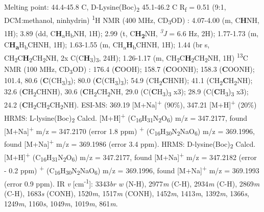 Melting point: 44.4-45.8 \textdegree C,
D-Lysine(Boc)\textsubscript{2} 45.1-46.2 \textdegree C
\newline
R\textsubscript{f} = 0.51 (9:1, DCM:methanol, ninhydrin)
\newline
\textsuperscript{1}H NMR (400 MHz, CD\textsubscript{3}OD) \textdelta : 4.07-4.00 (m, C\textbf{H}NH, 1H); 3.89 (dd, C\textbf{H}\textsubscript{a}H\textsubscript{b}NH, 1H); 2.99 (t, C\textbf{H\textsubscript{2}}NH, \textit{\textsuperscript{3}J} = 6.6 Hz, 2H); 1.77-1.73 (m, C\textbf{H\textsubscript{a}}H\textsubscript{b}CHNH, 1H); 1.63-1.55 (m, CH\textsubscript{a}\textbf{H}\textsubscript{b}CHNH, 1H); 1.44 (br s, CH\textsubscript{2}C\textbf{H}\textsubscript{2}CH\textsubscript{2}NH, 2x C(C\textbf{H}\textsubscript{3})\textsubscript{3}, 24H); 1.26-1.17 (m, CH\textsubscript{2}C\textbf{H}\textsubscript{2}CH\textsubscript{2}NH, 1H)
\newline
\textsuperscript{13}C NMR (100 MHz, CD\textsubscript{3}OD) \textdelta :
176.4 (\textbf{C}OOH); 158.7 (\textbf{C}OONH); 158.3 (\textbf{C}OONH); 101.4, 80.6 (\textbf{C}(CH\textsubscript{3})\textsubscript{3}); 80.0 (\textbf{C}(CH\textsubscript{3})\textsubscript{3}); 54.9 (CH\textsubscript{2}\textbf{C}HNH); 41.1 (CH\textsubscript{2}\textbf{C}H\textsubscript{2}NH); 32.6 (\textbf{C}H\textsubscript{2}CHNH), 30.6 (\textbf{C}H\textsubscript{2}CH\textsubscript{2}NH, 29.0 (C(\textbf{C}H\textsubscript{3})\textsubscript{3} x3); 28.9 (C(\textbf{C}H\textsubscript{3})\textsubscript{3} x3); 24.2 (\textbf{C}H\textsubscript{2}CH\textsubscript{2}CH\textsubscript{2}NH).  
\newline
ESI-MS: 369.19 [M+Na]\textsuperscript{+} (90\%), 347.21 [M+H]\textsuperscript{+} (20\%)
\newline
HRMS: L-lysine(Boc)\textsubscript{2} Calcd.
[M+H]\textsuperscript{+} (C\textsubscript{16}H\textsubscript{31}N\textsubscript{2}O\textsubscript{6}) m/z = 347.2177, found [M+Na]\textsuperscript{+} m/z = 347.2170 (error 1.8 ppm)
\newline
[M+Na]\textsuperscript{+} (C\textsubscript{16}H\textsubscript{30}N\textsubscript{2}NaO\textsubscript{6}) m/z = 369.1996, found [M+Na]\textsuperscript{+} m/z = 369.1986 (error 3.4 ppm).
\newline
HRMS: D-lysine(Boc)\textsubscript{2} Calcd. 
[M+H]\textsuperscript{+} (C\textsubscript{16}H\textsubscript{31}N\textsubscript{2}O\textsubscript{6}) m/z = 347.2177, found [M+Na]\textsuperscript{+} m/z = 347.2182 (error - 0.2 ppm)
\newline
[M+Na]\textsuperscript{+} (C\textsubscript{16}H\textsubscript{30}N\textsubscript{2}NaO\textsubscript{6}) m/z = 369.1996, found [M+Na]\textsuperscript{+} m/z = 369.1993 (error 0.9 ppm).
\newline 
IR \textit{v} [cm\textsuperscript{-1}]: 3343\textit{br w} (N-H), 2977\textit{m} (C-H), 2934\textit{m} (C-H), 2869\textit{m} (C-H), 1683\textit{s} (CONH), 1520\textit{m}, 1517\textit{m} (CONH), 1452\textit{m}, 1413\textit{m}, 1392\textit{m}, 1366\textit{s}, 1249\textit{m}, 1160\textit{s}, 1049\textit{m}, 1019\textit{m}, 861\textit{m}.   
\newline

